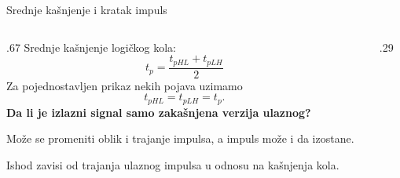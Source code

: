 \begin{frame}[label=02-s004]{Srednje kašnjenje i kratak impuls}
\setlength{\abovedisplayskip}{4pt}\setlength{\belowdisplayskip}{4pt}
\par\vspace{2mm}
\begin{columns}[T,onlytextwidth]
\begin{column}{.67\textwidth}
Srednje kašnjenje logičkog kola:
\[t_p=\frac{t_{pHL}+t_{pLH}}{2}\]
Za pojednostavljen prikaz \alert{nekih} pojava uzimamo
\[t_{pHL}=t_{pLH}=t_p.\]
\textbf{Da li je izlazni signal samo zakašnjena verzija ulaznog?}\par\vspace{1mm}
Može se promeniti oblik i trajanje impulsa, a impuls može i da izostane.\par\vspace{1mm}
\alert{Ishod zavisi od trajanja ulaznog impulsa u odnosu na kašnjenja kola.}
\end{column}
\begin{column}{.29\textwidth}\centering
\par\vspace{3mm}

\end{column}
\end{columns}
\end{frame}
